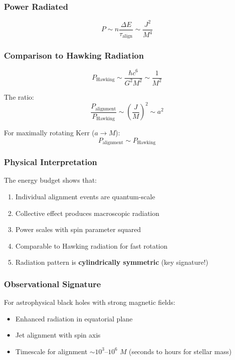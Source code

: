 \subsubsection{Power Radiated}

\begin{equation}
P \sim n \frac{\Delta E}{\tau_{\text{align}}} \sim \frac{J^2}{M^4}
\end{equation}

\subsubsection{Comparison to Hawking Radiation}

\begin{equation}
P_{\text{Hawking}} \sim \frac{\hbar c^6}{G^2 M^2} \sim \frac{1}{M^2}
\end{equation}

The ratio:
\begin{equation}
\frac{P_{\text{alignment}}}{P_{\text{Hawking}}} \sim \left(\frac{J}{M}\right)^2 \sim a^2
\end{equation}

For maximally rotating Kerr ($a \to M$):
\begin{equation}
P_{\text{alignment}} \sim P_{\text{Hawking}}
\end{equation}

\subsubsection{Physical Interpretation}

The energy budget shows that:
\begin{enumerate}
\item Individual alignment events are quantum-scale
\item Collective effect produces macroscopic radiation
\item Power scales with spin parameter squared
\item Comparable to Hawking radiation for fast rotation
\item Radiation pattern is \textbf{cylindrically symmetric} (key signature!)
\end{enumerate}

\subsubsection{Observational Signature}

For astrophysical black holes with strong magnetic fields:
\begin{itemize}
\item Enhanced radiation in equatorial plane
\item Jet alignment with spin axis
\item Timescale for alignment $\sim 10^3$--$10^6$ $M$ (seconds to hours for stellar mass)
\end{itemize}

